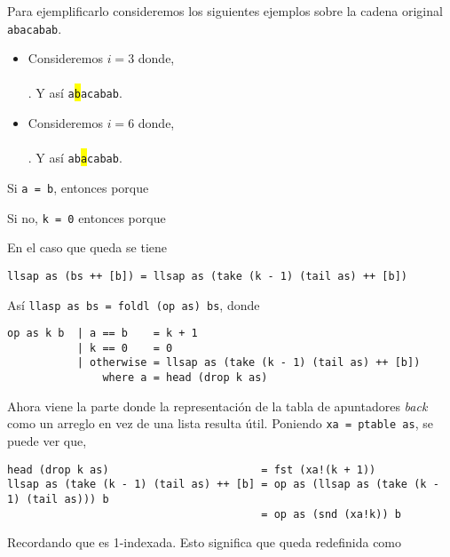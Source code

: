 Para ejemplificarlo consideremos los siguientes ejemplos sobre la cadena original \texttt{abacabab}.
\begin{itemize}
\item Consideremos $i = 3$ donde,\\
\\
.
Y así \texttt{a\colorbox{yellow}b}\texttt{acabab}.
\item Consideremos $i = 6$ donde,\\
\\
.
Y así \texttt{ab\colorbox{yellow}a}\texttt{cabab}.
\end{itemize}

Si \texttt{a = b}, entonces  porque %

Si no, \texttt{k = 0} entonces  porque %

En el caso que queda se tiene %
\begin{verbatim}
llsap as (bs ++ [b]) = llsap as (take (k - 1) (tail as) ++ [b])
\end{verbatim}

Así \texttt{llasp as bs = foldl (op as) bs}, donde
\begin{verbatim}
op as k b  | a == b    = k + 1
           | k == 0    = 0
           | otherwise = llsap as (take (k - 1) (tail as) ++ [b])
               where a = head (drop k as)
\end{verbatim}

Ahora viene la parte donde la representación de la tabla de apuntadores \textit{back} como un arreglo en vez de una lista
resulta útil. Poniendo \texttt{xa = ptable as}, se puede ver que,

\begin{verbatim}
head (drop k as)                        = fst (xa!(k + 1))
llsap as (take (k - 1) (tail as) ++ [b] = op as (llsap as (take (k - 1) (tail as))) b
                                        = op as (snd (xa!k)) b
\end{verbatim}

Recordando que  es 1-indexada. Esto significa que  queda redefinida como


\inputminted{haskell}{codigo/haskell/FailureFunctionOptimized.hs}
